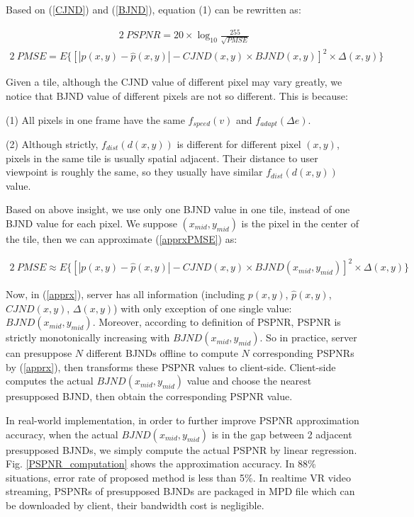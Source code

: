 Based on (\ref{CJND}) and (\ref{BJND}), equation (1) can be rewritten as:

\begin{alignat}{2}\
\label{f1} PSPNR = 20 \times \log_{10}\frac{255}{\sqrt{PMSE}}
\end{alignat}
\begin{alignat}{2}\
PMSE=E\{ \left[ |p(x, y) - \hat{p}(x, y)| - CJND(x, y) \times BJND(x, y)\right]^2 \times \Delta (x, y)\} \label{apprxPMSE}
\end{alignat} 

Given a tile, although the CJND value of different pixel may vary greatly, we notice that BJND value of different pixels are not so different. This is because:

 (1) All pixels in one frame have the same $f_{speed}(v)$ and $f_{adapt}(\Delta e)$. 
 
 (2) Although strictly, $f_{dist}(d(x, y))$ is different for different pixel $(x, y)$, pixels in the same tile is usually spatial adjacent. Their distance to user viewpoint is roughly the same, so they usually have similar $f_{dist}(d(x, y))$ value.

Based on above insight, we use only one BJND value in one tile, instead of one BJND value for each pixel. We suppose $(x_{mid}, y_{mid})$ is the pixel in the center of the tile, then we can approximate (\ref{apprxPMSE}) as:

\begin{alignat}{2}\
PMSE \approx E\{ \left[ |p(x, y) - \hat{p}(x, y)| - CJND(x, y) \times BJND(x_{mid}, y_{mid})\right]^2 \times \Delta (x, y)\} \label{apprx}
\end{alignat} 

Now, in (\ref{apprx}), server has all information (including $p(x, y)$, $\hat{p}(x, y)$, $CJND(x, y)$, $\Delta (x, y)$) with only exception of one single value: $BJND(x_{mid}, y_{mid})$. Moreover, according to definition of PSPNR, PSPNR is strictly monotonically increasing with $BJND(x_{mid}, y_{mid})$. So in practice, server can presuppose $N$ different BJNDs offline to compute $N$ corresponding PSPNRs by (\ref{apprx}), then transforms these PSPNR values to client-side. Client-side computes the actual $BJND(x_{mid}, y_{mid})$ value and choose the nearest presupposed BJND, then obtain the corresponding PSPNR value.

In real-world implementation, in order to further improve PSPNR approximation accuracy, when the actual $BJND(x_{mid}, y_{mid})$ is in the gap between 2 adjacent presupposed BJNDs, we simply compute the actual PSPNR by linear regression. Fig. \ref{PSPNR_computation} shows the approximation accuracy. In 88\% situations, error rate of proposed method is less than 5\%. In realtime VR video streaming, PSPNRs of presupposed BJNDs are packaged in MPD file which can be downloaded by client, their bandwidth cost is negligible.

